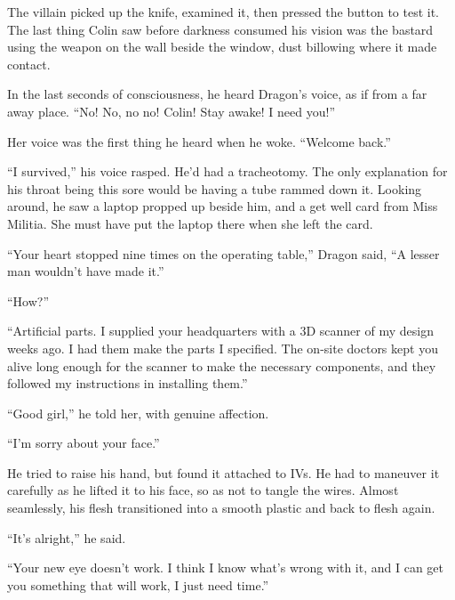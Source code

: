 The villain picked up the knife, examined it, then pressed the button to test it.  The last thing Colin saw before darkness consumed his vision was the bastard using the weapon on the wall beside the window, dust billowing where it made contact.



In the last seconds of consciousness, he heard Dragon's voice, as if from a far away place.  ``No!  No, no no!  Colin!  Stay awake!  I need you!''



\blacksquare



Her voice was the first thing he heard when he woke.  ``Welcome back.''



``I survived,'' his voice rasped.  He'd had a tracheotomy.  The only explanation for his throat being this sore would be having a tube rammed down it.  Looking around, he saw a laptop propped up beside him, and a get well card from Miss Militia.  She must have put the laptop there when she left the card.



``Your heart stopped nine times on the operating table,'' Dragon said, ``A lesser man wouldn't have made it.''



``How?''



``Artificial parts.  I supplied your headquarters with a 3D scanner of my design weeks ago.  I had them make the parts I specified.  The on-site doctors kept you alive long enough for the scanner to make the necessary components, and they followed my instructions in installing them.''



``Good girl,'' he told her, with genuine affection.



``I'm sorry about your face.''



He tried to raise his hand, but found it attached to IVs.  He had to maneuver it carefully as he lifted it to his face, so as not to tangle the wires.  Almost seamlessly, his flesh transitioned into a smooth plastic and back to flesh again.



``It's alright,'' he said.



``Your new eye doesn't work.  I think I know what's wrong with it, and I can get you something that will work, I just need time.''



